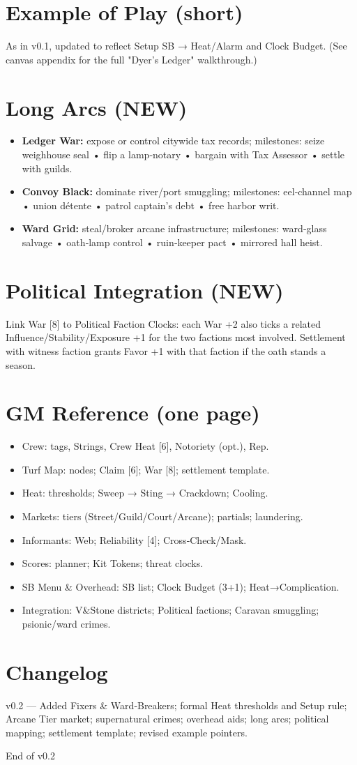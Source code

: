 \documentclass[11pt]{article}
\begin{document}
\section{Example of Play (short)}
As in v0.1, updated to reflect Setup SB → Heat/Alarm and Clock Budget. (See canvas appendix for the full "Dyer's Ledger" walkthrough.)

\section{Long Arcs (NEW)}
\begin{itemize}
\item \textbf{Ledger War:} expose or control citywide tax records; milestones: seize weighhouse seal • flip a lamp‑notary • bargain with Tax Assessor • settle with guilds.
\item \textbf{Convoy Black:} dominate river/port smuggling; milestones: eel‑channel map • union détente • patrol captain's debt • free harbor writ.
\item \textbf{Ward Grid:} steal/broker arcane infrastructure; milestones: ward‑glass salvage • oath‑lamp control • ruin‑keeper pact • mirrored hall heist.
\end{itemize}

\section{Political Integration (NEW)}
Link War [8] to Political Faction Clocks: each War +2 also ticks a related Influence/Stability/Exposure +1 for the two factions most involved. Settlement with witness faction grants Favor +1 with that faction if the oath stands a season.

\section{GM Reference (one page)}
\begin{itemize}
\item Crew: tags, Strings, Crew Heat [6], Notoriety (opt.), Rep.
\item Turf Map: nodes; Claim [6]; War [8]; settlement template.
\item Heat: thresholds; Sweep → Sting → Crackdown; Cooling.
\item Markets: tiers (Street/Guild/Court/Arcane); partials; laundering.
\item Informants: Web; Reliability [4]; Cross‑Check/Mask.
\item Scores: planner; Kit Tokens; threat clocks.
\item SB Menu \& Overhead: SB list; Clock Budget (3+1); Heat→Complication.
\item Integration: V\&Stone districts; Political factions; Caravan smuggling; psionic/ward crimes.
\end{itemize}

\section*{Changelog}
v0.2 --- Added Fixers \& Ward‑Breakers; formal Heat thresholds and Setup rule; Arcane Tier market; supernatural crimes; overhead aids; long arcs; political mapping; settlement template; revised example pointers.

End of v0.2
\end{document}
